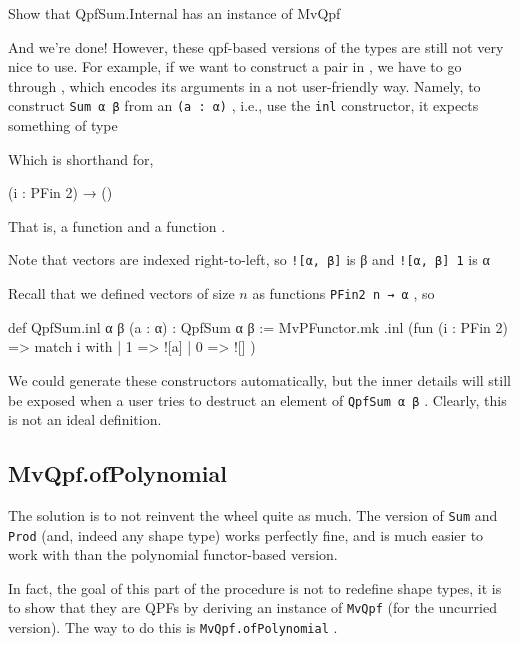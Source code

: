 \documentclass[titlepage]{report}
\newenvironment{remark}{%
\begin{framed}
\begin{trivlist}
    \item[\hskip \labelsep {\bfseries Remark:}]}%
{%
\end{trivlist}%
\end{framed}
}
\newenvironment{todo}{%
\definecolor{shadecolor}{HTML}{F8E0E0}%
\begin{shaded}%
\begin{trivlist}                         
    \item[\hskip \labelsep {\bfseries Todo:}]}{\end{trivlist}\end{shaded}}
\newcommand\lean[1]{{%
\def\leanmode{1}%
\small \texttt{#1}%
\undef\leanmode%
}}
\begin{document}
\begin{todo}
    Show that QpfSum.Internal has an instance of MvQpf
\end{todo}

And we're done! However, these qpf-based versions of the types are still not very nice to use.
For example, if we want to construct a pair in , we have to go through ,
which encodes its arguments in a not user-friendly way. 
Namely, to construct \lean{Sum α β} from an \lean{(a : α)}, i.e., use the \lean{inl} constructor, 
it expects something of type
\begin{center}
\end{center}
Which is shorthand for, 
\begin{center}
    (i : PFin 2) → ()
\end{center}
That is, a function  and a function .
\begin{remark}
    Note that vectors are indexed right-to-left, so \lean{![α, β]} is β
    and \lean{![α, β] 1} is α
\end{remark}

Recall that we defined vectors of size $n$ as functions \lean{PFin2 n → α}, so 


\begin{leancode}
    def QpfSum.inl {α β} (a : α) : QpfSum α β :=
      MvPFunctor.mk .inl (fun (i : PFin 2) => match i with
        | 1 => ![a]
        | 0 => ![]
      )
\end{leancode}


We could generate these constructors automatically, but the inner details will still be exposed
when a user tries to destruct an element of \lean{QpfSum α β}.
Clearly, this is not an ideal definition.

\subsection{MvQpf.ofPolynomial}
The solution is to not reinvent the wheel quite as much.
The  version of \lean{Sum} and \lean{Prod} (and, indeed any shape type) works
perfectly fine, and is much easier to work with than the polynomial functor-based version.

In fact, the goal of this part of the procedure is not to redefine shape types, it is to show that
they are QPFs by deriving an instance of \lean{MvQpf} (for the uncurried version).
The way to do this is \lean{MvQpf.ofPolynomial}.
\end{document}
